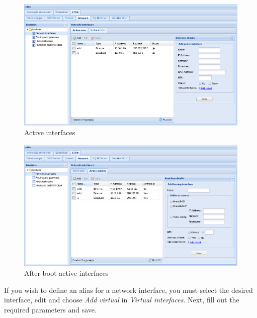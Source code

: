 \begin{figure}[H]
    \begin{center}
    \includegraphics[scale=0.38]{screenshots/etfw/etfw_network_interfaces_01.png}
    \caption{Active interfaces}
    \label{fig:etfw_network_interfaces_01}
    \end{center}
\end{figure}

\begin{figure}[H]
    \begin{center}
    \includegraphics[scale=0.38]{screenshots/etfw/etfw_network_interfaces_02.png}
    \caption{After boot active interfaces}
    \label{fig:etfw_network_interfaces_02}
    \end{center}
\end{figure}

If you wish to define an alias for a network interface, you must select the desired interface, edit and choose \textit{Add virtual} in \textit{Virtual interfaces}. Next, fill out the required parameters and save.

